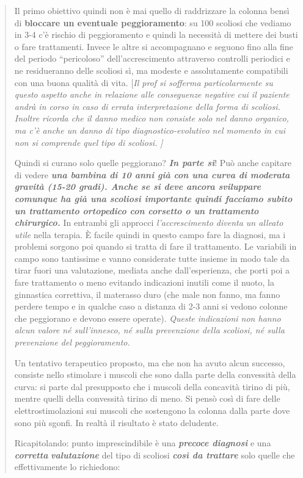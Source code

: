 \documentclass[]{article}
\begin{document}
\begin{quote}
Il primo obiettivo quindi non è mai quello di raddrizzare la colonna
bensì di \textbf{bloccare un eventuale peggioramento}: su 100 scoliosi
che vediamo in 3-4 c'è rischio di peggioramento e quindi la necessità di
mettere dei busti o fare trattamenti. Invece le altre si accompagnano e
seguono fino alla fine del periodo ``pericoloso'' dell'accrescimento
attraverso controlli periodici e ne residueranno delle scoliosi sì, ma
modeste e assolutamente compatibili con una buona qualità di vita.
{[}\emph{Il prof si sofferma particolarmente su questo aspetto anche in
relazione alle conseguenze negative cui il paziente andrà in corso in
caso di errata interpretazione della forma di scoliosi. Inoltre ricorda
che il danno medico non consiste solo nel danno organico, ma c'è anche
un danno di tipo \emph{diagnostico-evolutivo} nel momento in cui non si
comprende quel tipo di scoliosi. {]}}

Quindi si curano solo quelle peggiorano? \textbf{\emph{In parte sì}}!
Può anche capitare di vedere \textbf{\emph{una bambina di 10 anni già
con una curva di moderata gravità (15-20 gradi). Anche se si deve ancora
sviluppare comunque ha già una scoliosi importante quindi facciamo
subito un trattamento ortopedico con corsetto o un trattamento
chirurgico.}} In entrambi gli approcci \emph{l'accrescimento diventa un
alleato utile} nella terapia. È facile quindi in questo campo fare la
diagnosi, ma i problemi sorgono poi quando si tratta di fare il
trattamento. Le variabili in campo sono tantissime e vanno considerate
tutte insieme in modo tale da tirar fuori una valutazione, mediata anche
dall'esperienza, che porti poi a fare trattamento o meno evitando
indicazioni inutili come il nuoto, la ginnastica correttiva, il
materasso duro (che male non fanno, ma fanno perdere tempo e in qualche
caso a distanza di 2-3 anni si vedono colonne che peggiorano e devono
essere operate). \emph{Queste indicazioni non hanno alcun valore né
sull'innesco, né sulla prevenzione della scoliosi, né sulla prevenzione
del peggioramento. }

Un tentativo terapeutico proposto, ma che non ha avuto alcun successo,
consiste nello stimolare i muscoli che sono dalla parte della convessità
della curva: si parte dal presupposto che i muscoli della concavità
tirino di più, mentre quelli della convessità tirino di meno. Si pensò
così di fare delle elettrostimolazioni sui muscoli che sostengono la
colonna dalla parte dove sono più sgonfi. In realtà il risultato è stato
deludente.

Ricapitolando: punto imprescindibile è una \textbf{\emph{precoce
diagnosi}} e una \textbf{\emph{corretta}} \textbf{\emph{valutazione}}
del tipo di scoliosi \textbf{\emph{così da trattare}} solo quelle che
effettivamente lo richiedono:
\end{quote}
\end{document}
